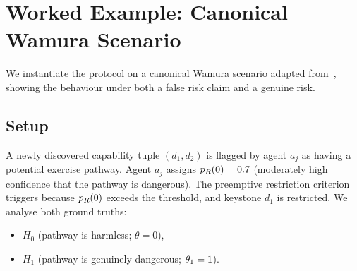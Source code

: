 \section{Worked Example: Canonical Wamura Scenario}
\label{sec:worked_example}

We instantiate the protocol on a canonical Wamura scenario
adapted from~\citep[Discussion]{lasser2026horizon}, showing the
behaviour under both a false risk claim and a genuine risk.

\subsection{Setup}

A newly discovered capability tuple $(d_1, d_2)$ is flagged by
agent $a_j$ as having a potential exercise pathway.  Agent $a_j$
assigns $p_R(0) = 0.7$ (moderately high confidence that the
pathway is dangerous).  The preemptive restriction
criterion~\citep[Proposition~1]{lasser2026horizon} triggers
because $p_R(0)$ exceeds the threshold, and keystone $d_1$ is
restricted.  We analyse both ground truths:
\begin{itemize}
\item $H_0$ (pathway is harmless; $\theta = 0$),
\item $H_1$ (pathway is genuinely dangerous; $\theta_1 = 1$).
\end{itemize}


